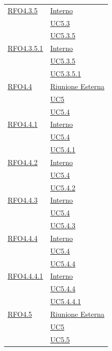 \begin{longtable}{|>{\centering}m{5cm}|m{5cm}<{\centering}|}
\hyperlink{RFO4.3.5}{RFO4.3.5} & \hyperlink{Interno}{Interno}\\
& \hyperref[UC5.3]{UC5.3}\\
& \hyperref[UC5.3.5]{UC5.3.5}\\ \hline

\hyperlink{RFO4.3.5.1}{RFO4.3.5.1} & \hyperlink{Interno}{Interno}\\
& \hyperref[UC5.3.5]{UC5.3.5}\\
& \hyperref[UC5.3.5.1]{UC5.3.5.1}\\ \hline

\hyperlink{RFO4.4}{RFO4.4} & \hyperlink{Riunione Esterna}{Riunione Esterna}\\
& \hyperref[UC5]{UC5}\\
& \hyperref[UC5.4]{UC5.4}\\ \hline

\hyperlink{RFO4.4.1}{RFO4.4.1} & \hyperlink{Interno}{Interno}\\
& \hyperref[UC5.4]{UC5.4}\\
& \hyperref[UC5.4.1]{UC5.4.1}\\ \hline

\hyperlink{RFO4.4.2}{RFO4.4.2} & \hyperlink{Interno}{Interno}\\
& \hyperref[UC5.4]{UC5.4}\\
& \hyperref[UC5.4.2]{UC5.4.2}\\ \hline

\hyperlink{RFO4.4.3}{RFO4.4.3} & \hyperlink{Interno}{Interno}\\
& \hyperref[UC5.4]{UC5.4}\\
& \hyperref[UC5.4.3]{UC5.4.3}\\ \hline

\hyperlink{RFO4.4.4}{RFO4.4.4} & \hyperlink{Interno}{Interno}\\
& \hyperref[UC5.4]{UC5.4}\\
& \hyperref[UC5.4.4]{UC5.4.4}\\ \hline

\hyperlink{RFO4.4.4.1}{RFO4.4.4.1} & \hyperlink{Interno}{Interno}\\
& \hyperref[UC5.4.4]{UC5.4.4}\\
& \hyperref[UC5.4.4.1]{UC5.4.4.1}\\ \hline

\hyperlink{RFO4.5}{RFO4.5} & \hyperlink{Riunione Esterna}{Riunione Esterna}\\
& \hyperref[UC5]{UC5}\\
& \hyperref[UC5.5]{UC5.5}\\ \hline


\end{longtable}
